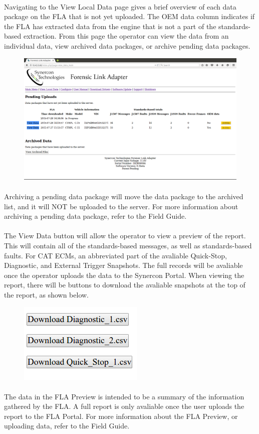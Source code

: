 \documentclass[11pt]{article}
\begin{document}
\paragraph{  }
Navigating to the View Local Data page gives a brief overview of each data package on the FLA that is not yet uploaded. The OEM data column indicates if the FLA has extracted data from the engine that is not a part of the standards-based extraction. From this page the operator can view the data from an individual data, view archived data packages, or archive pending data packages.
\begin{figure}[tbph]
\centering
\includegraphics[width=.95\linewidth]{../media/fla_preview_screenshots/local_data}
\label{fig:fla_preview_local_data}
\end{figure}
\paragraph{  }
Archiving a pending data package will move the data package to the archived list, and it will NOT be uploaded to the server. For more information about archiving a pending data package, refer to the Field Guide.
\paragraph{  }
The View Data button will allow the operator to view a preview of the report. This will contain all of the standards-based messages, as well as standards-based faults. For CAT ECMs, an abbreviated part of the avaliable Quick-Stop, Diagnostic, and External Trigger Snapshots. The full records will be avaliable once the operator uploads the data to the Synercon Portal. When viewing the report, there will be buttons to download the avaliable snapshots at the top of the report, as shown below.
\begin{figure}[tbph]
\centering
\includegraphics[width=.3\linewidth]{../media/fla_preview_screenshots/csv_download}
\end{figure}

\paragraph{  }
The data in the FLA Preview is intended to be a summary of the information gathered by the FLA. A full report is only avaliable once the user uploads the report to the FLA Portal. For more information about the FLA Preview, or uploading data, refer to the Field Guide.
\end{document}
